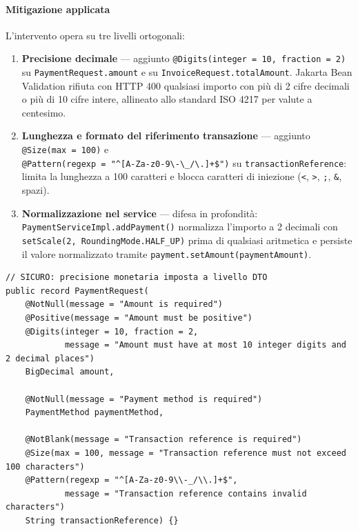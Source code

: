 ﻿\documentclass[a4paper,12pt]{report}
\begin{document}
\paragraph{Mitigazione applicata}
L'intervento opera su tre livelli ortogonali:

\begin{enumerate}
    \item \textbf{Precisione decimale} --- aggiunto
          \texttt{@Digits(integer = 10, fraction = 2)} su
          \texttt{PaymentRequest.amount} e su \texttt{InvoiceRequest.totalAmount}.
          Jakarta Bean Validation rifiuta con HTTP 400 qualsiasi importo con pi\`u
          di 2 cifre decimali o pi\`u di 10 cifre intere, allineato allo standard
          ISO 4217 per valute a centesimo.
    \item \textbf{Lunghezza e formato del riferimento transazione} ---
          aggiunto \texttt{@Size(max = 100)} e\\
          \texttt{@Pattern(regexp = "\^{}[A-Za-z0-9\textbackslash-\textbackslash\_/\textbackslash.]+\$")}
          su \texttt{transactionReference}: limita la lunghezza a 100 caratteri
          e blocca caratteri di iniezione (\texttt{<}, \texttt{>},
          \texttt{;}, \texttt{\&}, spazi).
    \item \textbf{Normalizzazione nel service} --- difesa in profondit\`a: \\
          \texttt{PaymentServiceImpl.addPayment()} normalizza l'importo a
          2 decimali con \texttt{setScale(2, RoundingMode.HALF\_UP)} prima
          di qualsiasi aritmetica e persiste il valore normalizzato
          tramite \texttt{payment.setAmount(paymentAmount)}.
\end{enumerate}

\begin{securebox}[title={Codice Sicuro --- PaymentRequest.java (fix)}]
\begin{lstlisting}[style=java]
// SICURO: precisione monetaria imposta a livello DTO
public record PaymentRequest(
    @NotNull(message = "Amount is required")
    @Positive(message = "Amount must be positive")
    @Digits(integer = 10, fraction = 2,
            message = "Amount must have at most 10 integer digits and 2 decimal places")
    BigDecimal amount,

    @NotNull(message = "Payment method is required")
    PaymentMethod paymentMethod,

    @NotBlank(message = "Transaction reference is required")
    @Size(max = 100, message = "Transaction reference must not exceed 100 characters")
    @Pattern(regexp = "^[A-Za-z0-9\\-_/\\.]+$",
            message = "Transaction reference contains invalid characters")
    String transactionReference) {}
\end{lstlisting}
\end{securebox}
\end{document}
